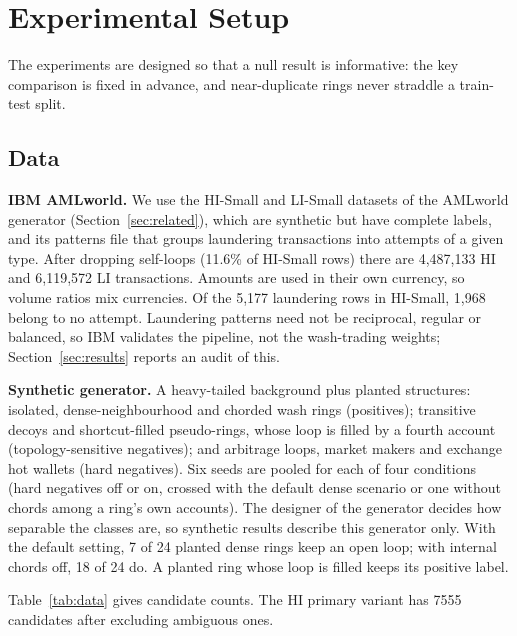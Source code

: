 \documentclass[conference]{IEEEtran}
\begin{document}
\section{Experimental Setup}
\label{sec:setup}

The experiments are designed so that a null result is informative: the key comparison is fixed in advance, and near-duplicate rings never straddle a train-test split.

\subsection{Data}
\textbf{IBM AMLworld.} We use the HI-Small and LI-Small datasets of the AMLworld generator (Section~\ref{sec:related}), which are synthetic but have complete labels, and its patterns file that groups laundering transactions into attempts of a given type. After dropping self-loops (11.6\% of HI-Small rows) there are 4{,}487{,}133 HI and 6{,}119{,}572 LI transactions. Amounts are used in their own currency, so volume ratios mix currencies. Of the 5{,}177 laundering rows in HI-Small, 1{,}968 belong to no attempt. Laundering patterns need not be reciprocal, regular or balanced, so IBM validates the pipeline, not the wash-trading weights; Section~\ref{sec:results} reports an audit of this.

\textbf{Synthetic generator.} A heavy-tailed background plus planted structures: isolated, dense-neighbourhood and chorded wash rings (positives); transitive decoys and shortcut-filled pseudo-rings, whose loop is filled by a fourth account (topology-sensitive negatives); and arbitrage loops, market makers and exchange hot wallets (hard negatives). Six seeds are pooled for each of four conditions (hard negatives off or on, crossed with the default dense scenario or one without chords among a ring's own accounts). The designer of the generator decides how separable the classes are, so synthetic results describe this generator only. With the default setting, 7 of 24 planted dense rings keep an open loop; with internal chords off, 18 of 24 do. A planted ring whose loop is filled keeps its positive label.

Table~\ref{tab:data} gives candidate counts. The HI primary variant has 7555 candidates after excluding ambiguous ones.
\end{document}
